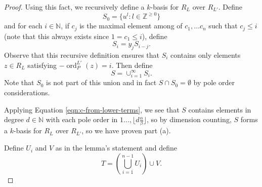 \documentclass{amsart}
\theoremstyle{plain}
\theoremstyle{definition}
\theoremstyle{remark}
\numberwithin{equation}{section}
\DeclareMathOperator{\ord}{ord}
\newcommand \halfcan{L}
\begin{document}
\begin{proof}
Using this fact, we recursively define a $k$-basis for $R_\halfcan$ over $R_{\halfcan'}$.  Define 
\[
	S_0 = \{u^l : l\in \mathbb{Z}^{\ge 0}\}
\]
and for each $i \in \mathbb{N}$, if $c_j$ is the maximal element among of $c_1, \ldots c_n$ such that $c_j \le i$ (note that this always exists since $1=c_1\le i$), define
\[
	S_i = y_j S_{i-j}.
\]
Observe that this recursive definition ensures that $S_i$ contains only elements $z\in R_\halfcan$ satisfying $-\ord^{\halfcan'}_P(z)=i$.
Then define 
\[
	S = \cup_{i=1}^{\infty} S_i.
\]
Note that $S_0$ is not part of this union and in fact $S\cap S_0 = \emptyset$ by pole order considerations.

Applying Equation \ref{eqn:c-from-lower-terms}, we see that $S$ contains elements in degree $d\in \mathbb{N}$ with each pole order in $1 \ldots, \lfloor d\frac{\alpha}{\beta}\rfloor$, so by dimension counting, $S$ forms a $k$-basis for $R_\halfcan$ over $R_{\halfcan'}$, so we have proven part (a).

Define $U_i$ and $V$ as in the lemma's statement and define
\[
	T = (\bigcup_{i=1}^{n-1} U_i) \cup V.
\]


\end{proof}
\end{document}
